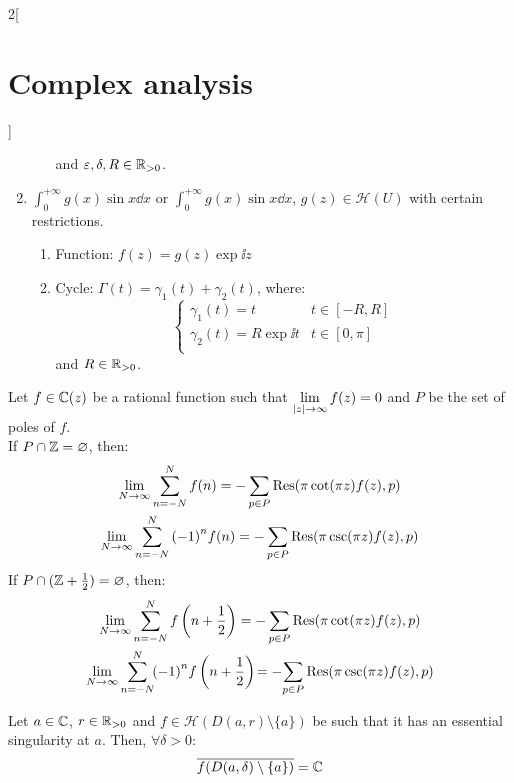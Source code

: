\documentclass[../../../main_math.tex]{subfiles}
\begin{document}
\begin{multicols}{2}[\section{Complex analysis}]
\begin{proposition}
\begin{enumerate}
\begin{enumerate}
$$                    $$
                    and $\varepsilon,\delta,R\in\mathbb{R}_{>0}$.
            \end{enumerate}
      \item $\displaystyle\int_0^{+\infty} g(x)\sin{x}\dd{x}$ or $\displaystyle\int_0^{+\infty} g(x)\sin{x}\dd{x}$, $g(z)\in\mathcal{H}(U)$ with certain restrictions.
            \begin{enumerate}
              \item Function: $f(z)=g(z)\exp{\ii z}$
              \item Cycle:  $\Gamma(t)=\gamma_1(t)+\gamma_2(t)$, where:
                    $$
                      \begin{cases}
                        \gamma_1(t)=t            & t\in[-R,R]  \\
                        \gamma_2(t)=R\exp{\ii t} & t\in[0,\pi] \\
                      \end{cases}
                    $$
                    and $R\in\mathbb{R}_{>0}$.
            \end{enumerate}
    \end{enumerate}
  \end{proposition}
  \begin{theorem}
    Let $f\in\mathbb{C}(z)$ be a rational function such that $\displaystyle\lim_{\abs{z}\to\infty}f(z)=0$ and $P$ be the set of poles of $f$. \\
    If $P\cap\mathbb{Z}=\varnothing$, then:
    \begin{gather*}
      \lim_{N\to\infty}\sum_{n=-N}^Nf(n)         =-\sum_{p\in P}\Res(\pi\cot(\pi z)f(z),p) \\
      \lim_{N\to\infty}\sum_{n=-N}^N{(-1)}^nf(n) =-\sum_{p\in P}\Res(\pi\csc(\pi z)f(z),p)
    \end{gather*}
    If $P\cap(\mathbb{Z}+\frac{1}{2})=\varnothing$, then:
    \begin{gather*}
      \lim_{N\to\infty}\sum_{n=-N}^Nf\left(n+\frac{1}{2}\right)         =-\sum_{p\in P}\Res(\pi\cot(\pi z)f(z),p) \\
      \lim_{N\to\infty}\sum_{n=-N}^N\!\!{(-1)}^nf\left(n+\frac{1}{2}\right)\! =-\!\sum_{p\in P}\Res(\pi\csc(\pi z)f(z),p)
    \end{gather*}
  \end{theorem}
  \begin{theorem}
    Let $a\in\mathbb{C}$, $r\in\mathbb{R}_{>0}$ and $f\in\mathcal{H}(D(a,r)\setminus\{a\})$ be such that it has an essential singularity at $a$. Then, $\forall \delta>0$: $$\overline{f(D(a,\delta)\setminus\{a\})}=\mathbb{C}$$

\end{theorem}
\end{multicols}
\end{document}

